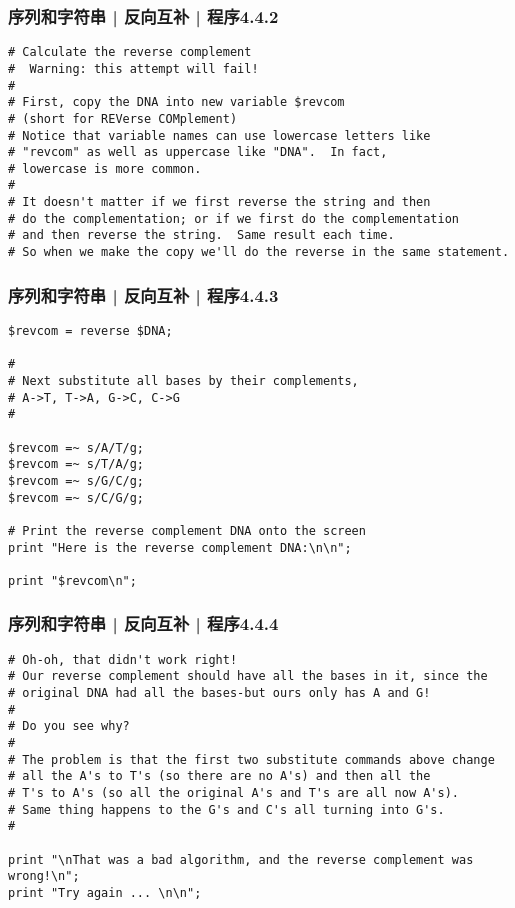 \begin{frame}[fragile]
  \frametitle{序列和字符串 | 反向互补 | 程序4.4.2}
  \vspace{-1.5em}
\begin{lstlisting}[firstnumber=12,basicstyle=\footnotesize\tt]
# Calculate the reverse complement
#  Warning: this attempt will fail!
#
# First, copy the DNA into new variable $revcom
# (short for REVerse COMplement)
# Notice that variable names can use lowercase letters like
# "revcom" as well as uppercase like "DNA".  In fact,
# lowercase is more common.
#
# It doesn't matter if we first reverse the string and then
# do the complementation; or if we first do the complementation
# and then reverse the string.  Same result each time.
# So when we make the copy we'll do the reverse in the same statement.
\end{lstlisting}
\end{frame}

\begin{frame}[fragile]
  \frametitle{序列和字符串 | 反向互补 | 程序4.4.3}
  \vspace{-1.5em}
\begin{lstlisting}[firstnumber=27,basicstyle=\footnotesize\tt]
$revcom = reverse $DNA;

#
# Next substitute all bases by their complements,
# A->T, T->A, G->C, C->G
#

$revcom =~ s/A/T/g;
$revcom =~ s/T/A/g;
$revcom =~ s/G/C/g;
$revcom =~ s/C/G/g;

# Print the reverse complement DNA onto the screen
print "Here is the reverse complement DNA:\n\n";

print "$revcom\n";
\end{lstlisting}
\end{frame}

\begin{frame}[fragile]
  \frametitle{序列和字符串 | 反向互补 | 程序4.4.4}
  \vspace{-1.5em}
\begin{lstlisting}[firstnumber=45,basicstyle=\scriptsize\tt]
# Oh-oh, that didn't work right!
# Our reverse complement should have all the bases in it, since the
# original DNA had all the bases-but ours only has A and G!
#
# Do you see why?
#
# The problem is that the first two substitute commands above change
# all the A's to T's (so there are no A's) and then all the
# T's to A's (so all the original A's and T's are all now A's).
# Same thing happens to the G's and C's all turning into G's.
#

print "\nThat was a bad algorithm, and the reverse complement was wrong!\n";
print "Try again ... \n\n";
\end{lstlisting}
\end{frame}

